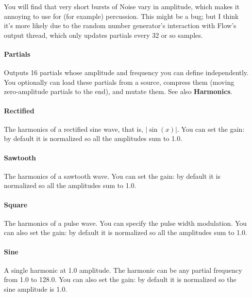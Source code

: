 \documentclass{article}
\begin{document}
You will find that very short bursts of Noise vary in amplitude, which makes it annoying to use for (for example) percussion.  This might be a bug; but I think it's more likely due to the random number generator's interaction with Flow's output thread, which only updates partials every 32 or so samples.

\paragraph{Partials}  Outputs 16 partials whose amplitude and frequency you can define independently.  You optionally can load these partials from a source, compress them (moving zero-amplitude partials to the end), and mutate them.  See also {\bf Harmonics}.


\paragraph{Rectified}  The harmonics of a rectified sine wave, that is, \(|\sin(x)|\).  You can set the gain: by default it is normalized so all the amplitudes sum to 1.0.

\paragraph{Sawtooth}  The harmonics of a sawtooth wave.  You can set the gain: by default it is normalized so all the amplitudes sum to 1.0.

\paragraph{Square}  The harmonics of a pulse wave.  You can specify the pulse width modulation.  You can also set the gain: by default it is normalized so all the amplitudes sum to 1.0.

\paragraph{Sine}  A single harmonic at 1.0 amplitude.  The harmonic can be any partial frequency from 1.0 to 128.0.  You can also set the gain: by default it is normalized so the sine amplitude is 1.0.
\end{document}
